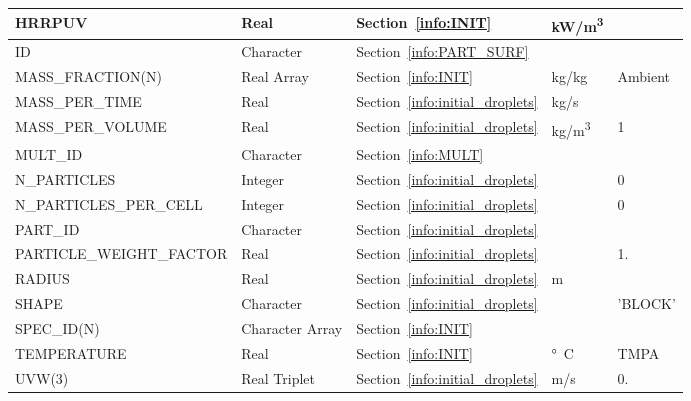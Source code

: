 \documentclass[11pt]{book}
\begin{document}
\begin{longtable}{@{\extracolsep{\fill}}|l|l|l|l|l|}
{\ct HRRPUV}                      & Real              & Section~\ref{info:INIT}                       & \si{kW/m^3}    &               \\ \hline
{\ct ID}                          & Character         & Section~\ref{info:PART_SURF}                  &                &               \\ \hline
{\ct MASS\_FRACTION(N)}           & Real Array        & Section~\ref{info:INIT}                       & kg/kg          & Ambient       \\ \hline
{\ct MASS\_PER\_TIME}             & Real              & Section~\ref{info:initial_droplets}           & kg/s           &               \\ \hline
{\ct MASS\_PER\_VOLUME}           & Real              & Section~\ref{info:initial_droplets}           & \si{kg/m^3}    & 1             \\ \hline
{\ct MULT\_ID }                   & Character         & Section~\ref{info:MULT}                       &                &               \\ \hline
{\ct N\_PARTICLES}                & Integer           & Section~\ref{info:initial_droplets}           &                & 0             \\ \hline
{\ct N\_PARTICLES\_PER\_CELL}     & Integer           & Section~\ref{info:initial_droplets}           &                & 0             \\ \hline
{\ct PART\_ID}                    & Character         & Section~\ref{info:initial_droplets}           &                &               \\ \hline
{\ct PARTICLE\_WEIGHT\_FACTOR}    & Real              & Section~\ref{info:initial_droplets}           &                & 1.            \\ \hline
{\ct RADIUS}                      & Real              & Section~\ref{info:initial_droplets}           & m              &               \\ \hline
{\ct SHAPE}                       & Character         & Section~\ref{info:initial_droplets}           &                & {\ct 'BLOCK'} \\ \hline
{\ct SPEC\_ID(N)}                 & Character Array   & Section~\ref{info:INIT}                       &                &               \\ \hline
{\ct TEMPERATURE}                 & Real              & Section~\ref{info:INIT}                       & \si{\degree C} & {\ct TMPA}    \\ \hline
{\ct UVW(3)}                      & Real Triplet      & Section~\ref{info:initial_droplets}           & m/s            & 0.            \\ \hline

\end{longtable}
\end{document}
